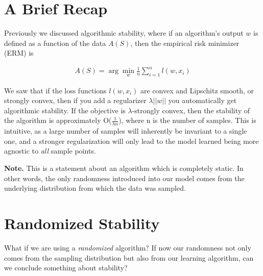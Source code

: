 \documentclass[12pt]{report}
\begin{document}

\maketitle

\vspace*{.1in}




\section{A Brief Recap}
Previously we discussed algorithmic stability, where if an algorithm's output $w$ is defined as a function of the data $A(S)$, then the empirical risk minimizer (ERM) is

\begin{align} \label{eq:ERM}
A(S) = \arg\min_w \frac{1}{n} \sum_{i=1}^n l(w,x_i)
\end{align}

We saw that if the loss functions $l(w,x_i)$ are convex and Lipschitz smooth, or strongly convex, then if you add a regularizer $\lambda||w||$ you automatically get algorithmic stability. If the objective is $\lambda$-strongly convex, then the stability of the algorithm is approximately O($\frac{1}{\lambda n}$), where n is the number of samples. This is intuitive, as a large number of samples will inherently be invariant to a single one, and a stronger regularization will only lead to the model learned being more agnostic to \textit{all} sample points.

\textbf{Note.} This is a statement about an algorithm which is completely static. In other words, the only randomness introduced into our model comes from the underlying distribution from which the data was sampled. 

\section{Randomized Stability}
What if we are using a \textit{randomized} algorithm? If now our randomness not only comes from the sampling distribution but also from our learning algorithm, can we conclude something about stability?
\end{document}
